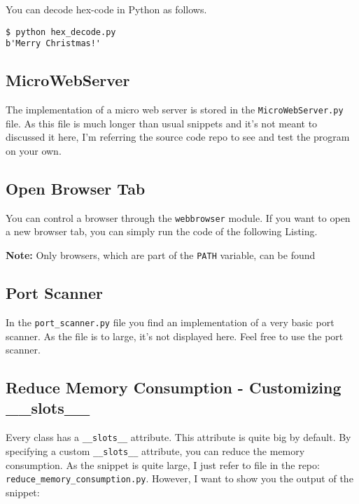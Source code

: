 You can decode hex-code in Python as follows.



\begin{lstlisting}[caption=Output of hex\_decode.py]
$ python hex_decode.py
b'Merry Christmas!'
\end{lstlisting}


\subsection{MicroWebServer}

The implementation of a micro web server is stored in the \lstinline{MicroWebServer.py} file.
As this file is much longer than usual snippets and it's not meant to discussed it here, I'm referring the source code repo to see and test the program on your own.


\subsection{Open Browser Tab}

You can control a browser through the \lstinline{webbrowser} module.
If you want to open a new browser tab, you can simply run the code of the following Listing.

\textbf{Note:} Only browsers, which are part of the \lstinline{PATH} variable, can be found




\subsection{Port Scanner}

In the \lstinline{port_scanner.py} file you find an implementation of a very basic port scanner.
As the file is to large, it's not displayed here.
Feel free to use the port scanner.


\subsection{Reduce Memory Consumption - Customizing \_\_slots\_\_}

Every class has a \lstinline{__slots__} attribute.
This attribute is quite big by default.
By specifying a custom \lstinline{__slots__} attribute, you can reduce the memory consumption.
As the snippet is quite large, I just refer to file in the repo: \lstinline{reduce_memory_consumption.py}.
However, I want to show you the output of the snippet:

